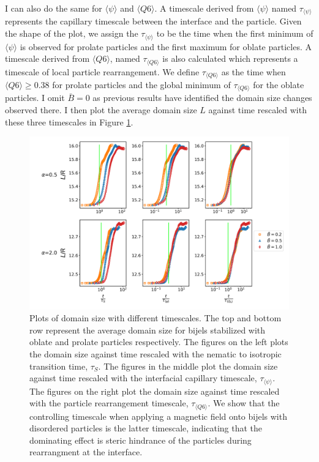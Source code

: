 I can also do the same for $\langle \psi \rangle$ and
$\langle Q6 \rangle$. A timescale derived from
$\langle \psi \rangle$ named $\tau_{\langle \psi \rangle}$
represents the capillary timescale between the interface and the
particle. Given the shape of the plot, we assign the
$\tau_{\langle \psi \rangle}$ to be the time when the first minimum of
$\langle \psi \rangle$ is observed for prolate particles and the first
maximum for oblate particles. A timescale derived from
$\langle Q6 \rangle$, named $\tau_{\langle Q6 \rangle}$ is also
calculated which represents a timescale of local particle rearrangement.
We define $\tau_{\langle Q6 \rangle}$ as the time when
\(\langle Q6 \rangle \geq 0.38\) for prolate particles and the global
minimum of $\tau_{\langle Q6 \rangle}$ for the oblate particles. I
omit \(\bar{B} = 0\) as previous results have identified the domain size
changes observed there. I then plot the average domain size $L$
against time rescaled with these three timescales in Figure
\ref{fig:domain_size-field_on-scaled}.

\begin{figure} 
\centering 
\includegraphics[scale=0.4]{../figures/results/paper2/domain_size-field_on-scaled.png} 
\caption{Plots of domain size with different timescales. The top and bottom row represent the average domain size for bijels stabilized with oblate and prolate particles respectively. The figures on the left plots the domain size against time rescaled with the nematic to isotropic transition time, $\tau_S$. The figures in the middle plot the domain size against time rescaled with the interfacial capillary timescale, $\tau_{\langle \psi \rangle}$. The figures on the right plot the domain size against time rescaled with the particle rearrangement timescale, $\tau_{\langle Q6 \rangle}$. We show that the controlling timescale when applying a magnetic field onto bijels with disordered particles is the latter timescale, indicating that the dominating effect is steric hindrance of the particles during rearrangment at the interface.} 
\label{fig:domain_size-field_on-scaled} 
\end{figure}

